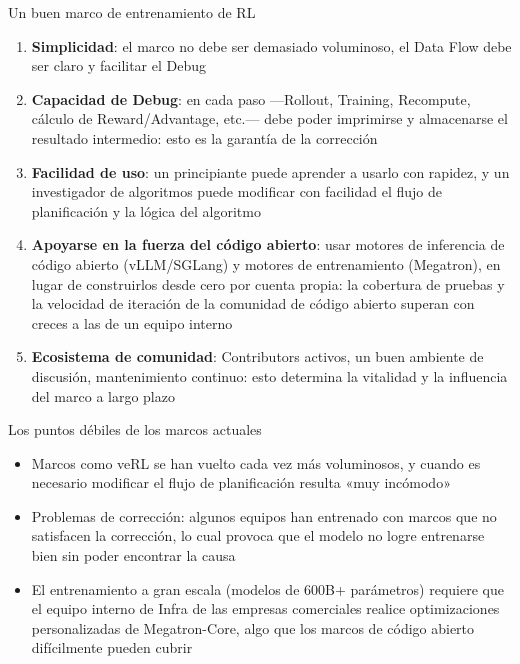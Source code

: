 \documentclass[a4paper]{article}
\begin{document}
\begin{importantbox}{Un buen marco de entrenamiento de RL}
\begin{enumerate}
    \item \textbf{Simplicidad}: el marco no debe ser demasiado voluminoso, el Data Flow debe ser claro y facilitar el Debug
    \item \textbf{Capacidad de Debug}: en cada paso —Rollout, Training, Recompute, cálculo de Reward/Advantage, etc.— debe poder imprimirse y almacenarse el resultado intermedio: esto es la garantía de la corrección
    \item \textbf{Facilidad de uso}: un principiante puede aprender a usarlo con rapidez, y un investigador de algoritmos puede modificar con facilidad el flujo de planificación y la lógica del algoritmo
    \item \textbf{Apoyarse en la fuerza del código abierto}: usar motores de inferencia de código abierto (vLLM/SGLang) y motores de entrenamiento (Megatron), en lugar de construirlos desde cero por cuenta propia: la cobertura de pruebas y la velocidad de iteración de la comunidad de código abierto superan con creces a las de un equipo interno
    \item \textbf{Ecosistema de comunidad}: Contributors activos, un buen ambiente de discusión, mantenimiento continuo: esto determina la vitalidad y la influencia del marco a largo plazo
\end{enumerate}
\end{importantbox}

\begin{warningbox}{Los puntos débiles de los marcos actuales}
\begin{itemize}
    \item Marcos como veRL se han vuelto cada vez más voluminosos, y cuando es necesario modificar el flujo de planificación resulta «muy incómodo»
    \item Problemas de corrección: algunos equipos han entrenado con marcos que no satisfacen la corrección, lo cual provoca que el modelo no logre entrenarse bien sin poder encontrar la causa
    \item El entrenamiento a gran escala (modelos de 600B+ parámetros) requiere que el equipo interno de Infra de las empresas comerciales realice optimizaciones personalizadas de Megatron-Core, algo que los marcos de código abierto difícilmente pueden cubrir
\end{itemize}
\end{warningbox}
\end{document}
